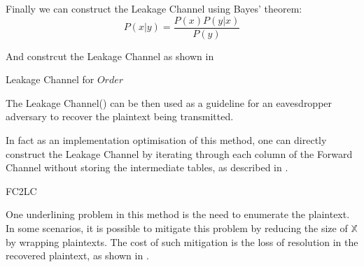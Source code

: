 \begin{example}
Finally we can construct the Leakage Channel using Bayes’ theorem:
\begin{equation}
P(x|y) = {\frac {P(x)P(y|x)} {P(y)}} 
\end{equation}

And constrcut the Leakage Channel as shown in 

\begin{table}[H]
\begin{center}
{}
\end{center}
\caption{Leakage Channel for $Order$}
\label{Tbl: Leakage Channel for Order}
\end{table}

The Leakage Channel() can be then used as a guideline for an eavesdropper adversary to recover the plaintext being transmitted.

In fact as an implementation optimisation of this method, one can directly construct the Leakage Channel by iterating through each column of the Forward Channel without storing the intermediate tables, as described in .

\begin{algorithm}[H]
 \caption{FC2LC} \label{Alg: FC2LC}
\end{algorithm}

\end{example}

One underlining problem in this method is the need to enumerate the plaintext. In some scenarios, it is possible to mitigate this problem by reducing the size of $\mathbb{X}$ by wrapping plaintexts. The cost of such mitigation is the loss of resolution in the recovered plaintext, as shown in .

